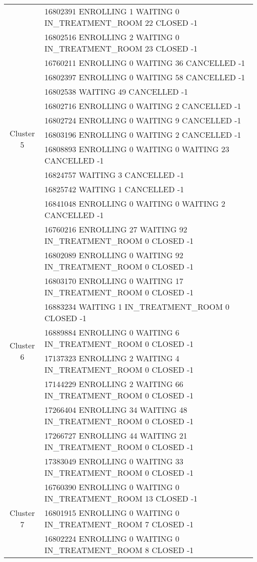 {\begin{longtable}{|c|p{}|}
		& 16802391 ENROLLING 1 WAITING 0 IN\_TREATMENT\_ROOM 22 CLOSED -1 \\
		& 16802516 ENROLLING 2 WAITING 0 IN\_TREATMENT\_ROOM 23 CLOSED -1 \\
		\hline
		\multirow{10}{*}{Cluster 5}
		& 16760211 ENROLLING 0 WAITING 36 CANCELLED -1 \\
		& 16802397 ENROLLING 0 WAITING 58 CANCELLED -1 \\
		& 16802538 WAITING 49 CANCELLED -1 \\
		& 16802716 ENROLLING 0 WAITING 2 CANCELLED -1 \\
		& 16802724 ENROLLING 0 WAITING 9 CANCELLED -1 \\
		& 16803196 ENROLLING 0 WAITING 2 CANCELLED -1 \\
		& 16808893 ENROLLING 0 WAITING 0 WAITING 23 CANCELLED -1 \\
		& 16824757 WAITING 3 CANCELLED -1 \\
		& 16825742 WAITING 1 CANCELLED -1 \\
		& 16841048 ENROLLING 0 WAITING 0 WAITING 2 CANCELLED -1 \\
		\hline
		\multirow{10}{*}{Cluster 6}
		& 16760216 ENROLLING 27 WAITING 92 IN\_TREATMENT\_ROOM 0 CLOSED -1 \\
		& 16802089 ENROLLING 0 WAITING 92 IN\_TREATMENT\_ROOM 0 CLOSED -1 \\
		& 16803170 ENROLLING 0 WAITING 17 IN\_TREATMENT\_ROOM 0 CLOSED -1 \\
		& 16883234 WAITING 1 IN\_TREATMENT\_ROOM 0 CLOSED -1 \\
		& 16889884 ENROLLING 0 WAITING 6 IN\_TREATMENT\_ROOM 0 CLOSED -1 \\
		& 17137323 ENROLLING 2 WAITING 4 IN\_TREATMENT\_ROOM 0 CLOSED -1 \\
		& 17144229 ENROLLING 2 WAITING 66 IN\_TREATMENT\_ROOM 0 CLOSED -1 \\
		& 17266404 ENROLLING 34 WAITING 48 IN\_TREATMENT\_ROOM 0 CLOSED -1 \\
		& 17266727 ENROLLING 44 WAITING 21 IN\_TREATMENT\_ROOM 0 CLOSED -1 \\
		& 17383049 ENROLLING 0 WAITING 33 IN\_TREATMENT\_ROOM 0 CLOSED -1 \\
		\hline
		\multirow{10}{*}{Cluster 7}
		& 16760390 ENROLLING 0 WAITING 0 IN\_TREATMENT\_ROOM 13 CLOSED -1 \\
		& 16801915 ENROLLING 0 WAITING 0 IN\_TREATMENT\_ROOM 7 CLOSED -1 \\
		& 16802224 ENROLLING 0 WAITING 0 IN\_TREATMENT\_ROOM 8 CLOSED -1 \\

\end{longtable}}
